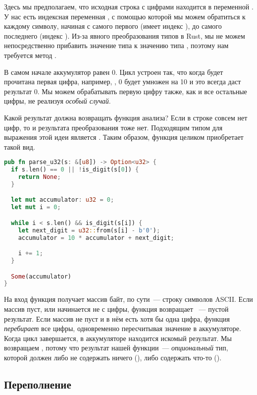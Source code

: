 Здесь мы предполагаем, что исходная строка с цифрами находится в переменной .
У нас есть индексная переменная , с помощью которой мы можем обратиться к каждому символу, начиная с самого первого (имеет индекс ), до самого последнего (индекс ).
Из-за явного преобразования типов в Rust, мы не можем непосредственно прибавить значение типа  к значению типа , поэтому нам требуется метод .

В самом начале аккумулятор равен 0.
Цикл устроен так, что когда будет прочитана первая цифра, например, , 0 будет умножен на 10 и это всегда даст результат 0.
Мы можем обрабатывать первую цифру также, как и все остальные цифры, не реализуя {\em особый случай}.

Какой результат должна возвращать функция анализа?
Если в строке совсем нет цифр, то и результата преобразования тоже нет.
Подходящим типом для выражения этой идеи является .
Таким образом, функция целиком приобретает такой вид.

\begin{lstlisting}[language=Rust]
pub fn parse_u32(s: &[u8]) -> Option<u32> {
  if s.len() == 0 || !is_digit(s[0]) {
    return None;
  }

  let mut accumulator: u32 = 0;
  let mut i = 0;

  while i < s.len() && is_digit(s[i]) {
    let next_digit = u32::from(s[i] - b'0');
    accumulator = 10 * accumulator + next_digit;

    i += 1;
  }

  Some(accumulator)
}
\end{lstlisting}

На вход функция получает массив байт, по сути~--- строку символов ASCII.
Если массив пуст, или начинается не с цифры, функция возвращает ~--- пустой результат.
Если массив не пуст и в нём есть хотя бы одна цифра, функция {\em перебирает} все цифры, одновременно пересчитывая значение в аккумуляторе.
Когда цикл завершается, в аккумуляторе находится искомый результат.
Мы возвращаем , потому что результат нашей функции~--- {\em опциональный} тип, которой должен либо не содержать ничего (), либо содержать что-то ().

\subsection{Переполнение}

